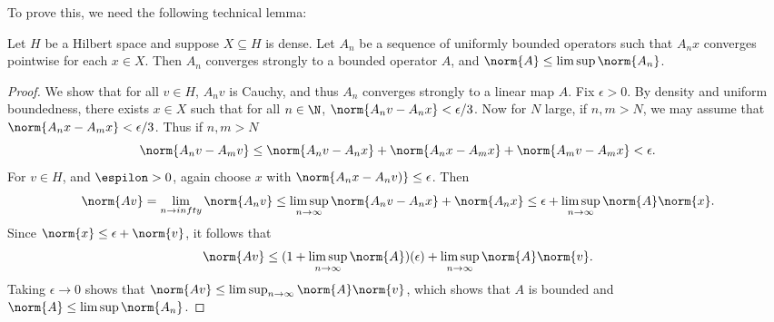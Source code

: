 \documentclass[12pt]{amsart}
\begin{document}
To prove this, we need the following technical lemma:
\begin{lem}\label{technical}Let $H$ be a Hilbert space and suppose $X \subseteq H$ is dense. Let $A_n$ be a sequence of uniformly bounded operators such that $A_nx$ converges pointwise for each $x \in X$. Then $A_n$ converges strongly to a bounded operator $A$, and $\norm{A} \leq \limsup \norm{A_n}$.\end{lem}
\begin{proof}We show that for all $v \in H$, $A_nv$ is Cauchy, and thus $A_n$ converges strongly to a linear map $A$. Fix $\epsilon > 0$. By density and uniform boundedness, there exists $x \in X$ such that for all $n \in \N$, $\norm{A_nv-A_nx} < \epsilon/3$. Now for $N$ large, if $n,m> N$, we may assume that $\norm{A_nx-A_mx} < \epsilon/3$. Thus if $n,m > N$
\[\norm{A_nv-A_mv} \leq \norm{A_nv-A_nx} + \norm{A_nx-A_mx} + \norm{A_mv-A_mx} < \epsilon.\]
For $v \in H$, and $\espilon > 0$, again choose $x$ with $\norm{A_nx-A_nv)} \leq \epsilon$. Then
\[\norm{Av} = \lim_{n \to infty} \norm{A_nv} \leq \limsup_{n \to \infty} \norm{A_nv-A_nx} + \norm{A_nx} \leq \epsilon + \limsup_{n \to \infty}\norm{A}\norm{x}.\]
Since $\norm{x} \leq \epsilon + \norm{v}$, it follows that
\[\norm{Av} \leq (1+\limsup_{n \to \infty}\norm{A})(\epsilon) + \limsup_{n \to \infty}\norm{A}\norm{v}.\]
Taking $\epsilon \to 0$ shows that $\norm{Av} \leq \limsup_{n \to \infty}\norm{A}\norm{v}$, which shows that $A$ is bounded and $\norm{A} \leq \limsup \norm{A_n}$.\end{proof}
\end{document}
